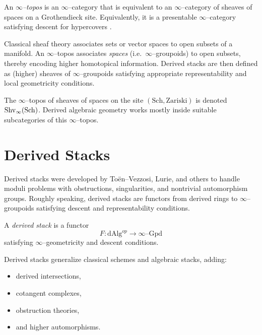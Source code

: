 \begin{definition}
An \emph{$\infty$--topos} is an $\infty$--category that is equivalent to an
$\infty$--category of sheaves of spaces on a Grothendieck site. Equivalently,
it is a presentable $\infty$--category satisfying descent for hypercovers
\cite{Lurie2009HTT}.
\end{definition}

Classical sheaf theory associates sets or vector spaces to open subsets of a
manifold. An $\infty$--topos associates \emph{spaces} (i.e.\ $\infty$--groupoids)
to open subsets, thereby encoding higher homotopical information. Derived
stacks are then defined as (higher) sheaves of $\infty$--groupoids satisfying
appropriate representability and local geometricity conditions.

\begin{remark}
The $\infty$--topos of sheaves of spaces on the site $(\mathrm{Sch},\mathrm{Zariski})$
is denoted ${\rm Shv}_{\infty}(\mathrm{Sch})$. Derived algebraic geometry works
mostly inside suitable subcategories of this $\infty$--topos.
\end{remark}

\section{Derived Stacks}

Derived stacks were developed by Toën–Vezzosi, Lurie, and others to handle
moduli problems with obstructions, singularities, and nontrivial automorphism
groups. Roughly speaking, derived stacks are functors from derived rings to
$\infty$--groupoids satisfying descent and representability conditions.

\begin{definition}
A \emph{derived stack} is a functor
\[
  F : \mathrm{dAlg}^{op} \longrightarrow \infty\text{--}\mathrm{Gpd}
\]
satisfying $\infty$--geometricity and descent conditions.
\end{definition}

Derived stacks generalize classical schemes and algebraic stacks, adding:
\begin{itemize}
  \item derived intersections,
  \item cotangent complexes,
  \item obstruction theories,
  \item and higher automorphisms.
\end{itemize}

